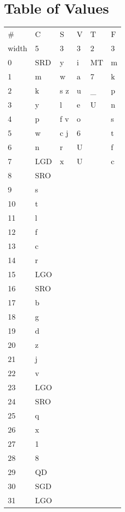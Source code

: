 \section{Table of Values}\label{values}


\begin{tabular}[c]{@{}llllll@{}}
\toprule
\#     & C   & S   & V & T   & F \\
width & 5   & 3   & 3 & 2   & 3 \\
\midrule
0     & SRD & y   & i & MT  & m \\
1     & m   & w   & a & 7   & k \\
2     & k   & s z & u & \_   & p \\
3     & y   & l   & e & U   & n \\
4     & p   & f v & o &     & s \\
5     & w   & c j & 6 &     & t \\
6     & n   & r   & U &     & f \\
7     & LGD & x   & U &     & c \\
8     & SRO &     &   &     &   \\
9     & s   &     &   &     &   \\
10    & t   &     &   &     &   \\
11    & l   &     &   &     &   \\
12    & f   &     &   &     &   \\
13    & c   &     &   &     &   \\
14    & r   &     &   &     &   \\
15    & LGO &     &   &     &   \\
16    & SRO &     &   &     &   \\
17    & b   &     &   &     &   \\
18    & g   &     &   &     &   \\
19    & d   &     &   &     &   \\
20    & z   &     &   &     &   \\
21    & j   &     &   &     &   \\
22    & v   &     &   &     &   \\
23    & LGO &     &   &     &   \\
24    & SRO &     &   &     &   \\
25    & q   &     &   &     &   \\
26    & x   &     &   &     &   \\
27    & 1   &     &   &     &   \\
28    & 8   &     &   &     &   \\
29    & QD  &     &   &     &   \\
30    & SGD &     &   &     &   \\
31    & LGO &     &   &     &   \\
\bottomrule
\end{tabular}
